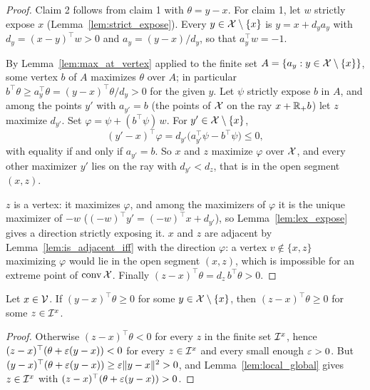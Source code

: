 \begin{proof}
  \leanok
  Claim 2 follows from claim 1 with $\theta = y - x$. For claim 1, let $w$ strictly expose $x$
  (Lemma~\ref{lem:strict_expose}). Every $y \in \mathcal{X} \setminus \{x\}$ is $y = x + d_y a_y$ with
  $d_y = (x - y)^\top w > 0$ and $a_y = (y - x)/d_y$, so that $a_y^\top w = -1$.

  By Lemma~\ref{lem:max_at_vertex} applied to the finite set $A = \{a_y : y \in \mathcal{X} \setminus \{x\}\}$,
  some vertex $b$ of $A$ maximizes $\theta$ over $A$; in particular
  $b^\top \theta \ge a_{y}^\top \theta = (y - x)^\top \theta / d_y > 0$ for the given $y$. Let $\psi$
  strictly expose $b$ in $A$, and among the points $y'$ with $a_{y'} = b$ (the points of $\mathcal{X}$ on the
  ray $x + \mathbb{R}_+ b$) let $z$ maximize $d_{y'}$. Set $\varphi = \psi + (b^\top \psi)\, w$. For
  $y' \in \mathcal{X} \setminus \{x\}$,
  \[
    (y' - x)^\top \varphi = d_{y'} \bigl(a_{y'}^\top \psi - b^\top \psi\bigr) \le 0,
  \]
  with equality if and only if $a_{y'} = b$. So $x$ and $z$ maximize $\varphi$ over $\mathcal{X}$, and every
  other maximizer $y'$ lies on the ray with $d_{y'} < d_z$, that is in the open segment $(x, z)$.

  $z$ is a vertex: it maximizes $\varphi$, and among the maximizers of $\varphi$ it is the unique
  maximizer of $-w$ ($(-w)^\top y' = (-w)^\top x + d_{y'}$), so Lemma~\ref{lem:lex_expose} gives a
  direction strictly exposing it. $x$ and $z$ are adjacent by Lemma~\ref{lem:is_adjacent_iff} with
  the direction $\varphi$: a vertex $v \notin \{x, z\}$ maximizing $\varphi$ would lie in the open
  segment $(x, z)$, which is impossible for an extreme point of $\operatorname{conv} \mathcal{X}$. Finally
  $(z - x)^\top \theta = d_z\, b^\top \theta > 0$.
\end{proof}

\begin{lemma}
  \label{lem:adjacency_ge}
  \leanok
  Let $x \in \mathcal{V}$. If $(y - x)^\top \theta \ge 0$ for some $y \in \mathcal{X} \setminus \{x\}$, then
  $(z - x)^\top \theta \ge 0$ for some $z \in \mathcal{I}^x$.
\end{lemma}

\begin{proof}
  \leanok
  Otherwise $(z - x)^\top \theta < 0$ for every $z$ in the finite set $\mathcal{I}^x$, hence
  $(z - x)^\top (\theta + \varepsilon (y - x)) < 0$ for every $z \in \mathcal{I}^x$ and every small enough
  $\varepsilon > 0$. But $(y - x)^\top(\theta + \varepsilon (y - x)) \ge \varepsilon \lVert y - x \rVert^2 > 0$, and
  Lemma~\ref{lem:local_global} gives $z \in \mathcal{I}^x$ with $(z - x)^\top (\theta + \varepsilon(y - x)) > 0$.
\end{proof}


